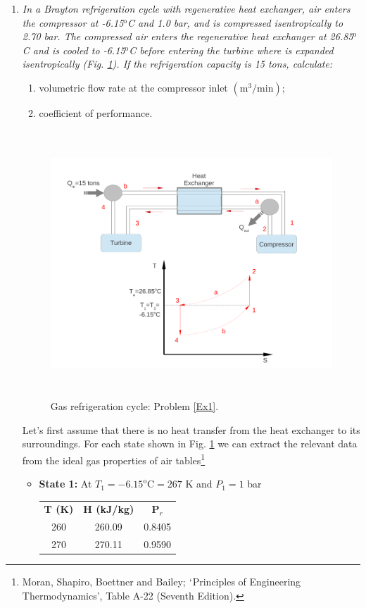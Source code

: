 \begin{enumerate}
\item \label{Ex1} {\it In a Brayton refrigeration cycle with regenerative heat exchanger, air enters the compressor at -6.15$^{\text{o}}$C and 1.0 bar, and is compressed isentropically to 2.70 bar. The compressed air enters the regenerative heat exchanger at 26.85$^{\text{o}}$C and is cooled to -6.15$^{\text{o}}$C before entering the turbine where is expanded isentropically (Fig. \ref{Ex1:Fig}). If the refrigeration capacity is 15 tons, calculate:
\begin{enumerate}
\item volumetric flow rate at the compressor inlet $\left(\text{m}^{3}/\text{min}\right)$;
\item coefficient of performance.
\end{enumerate}
}


\begin{figure}[h]
\begin{center}
\includegraphics[width=13.0cm,height=10.0cm]{./Pics/Overview_Refrig11}
\end{center}
\caption{Gas refrigeration cycle: Problem \ref{Ex1}.}\label{Ex1:Fig}
\end{figure}

Let's first assume that there is no heat transfer from the heat exchanger to its surroundings. For each state shown in Fig. \ref{Ex1:Fig} we can extract the relevant data from the ideal gas properties of air tables\footnote{Moran, Shapiro, Boettner and Bailey; $\lq$Principles of Engineering Thermodynamics', Table A-22 (Seventh Edition).} 
\begin{itemize}
\item {\bf State 1:} At $T_{1}=-6.15^{\text{o}}\text{C}=267\text{ K}$ and $P_{1}=1$ bar\\
\begin{tabular}{ c c c }
{\bf T (K)} & {\bf H (kJ/kg)}  & {\bf P$_{r}$} \\
  260       &   260.09         &    0.8405  \\
  270       &   270.11         &    0.9590  \\
\end{tabular}


\end{itemize}
\end{enumerate}
